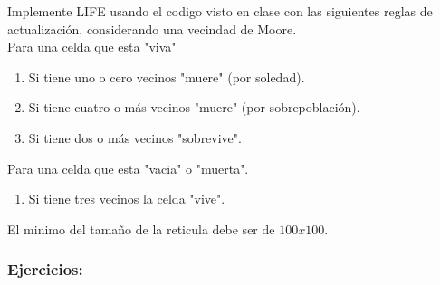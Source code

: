 \documentclass[12pt]{article}
\begin{document}
Implemente LIFE usando el codigo visto en clase con las siguientes reglas de actualización, considerando una vecindad de Moore.\\

Para una celda que esta "viva"
\begin{enumerate}
    \item Si tiene uno o cero vecinos "muere" (por soledad).
    \item Si tiene cuatro o más vecinos "muere" (por sobrepoblación).
    \item Si tiene dos o más vecinos "sobrevive".
\end{enumerate}

Para una celda que esta "vacia" o "muerta".
\begin{enumerate}
    \item Si tiene tres vecinos la celda "vive".
\end{enumerate}

El minimo del tamaño de la reticula debe ser de $100x100$.\\

{\color{blue} \subsubsection*{Ejercicios:}}
\end{document}
